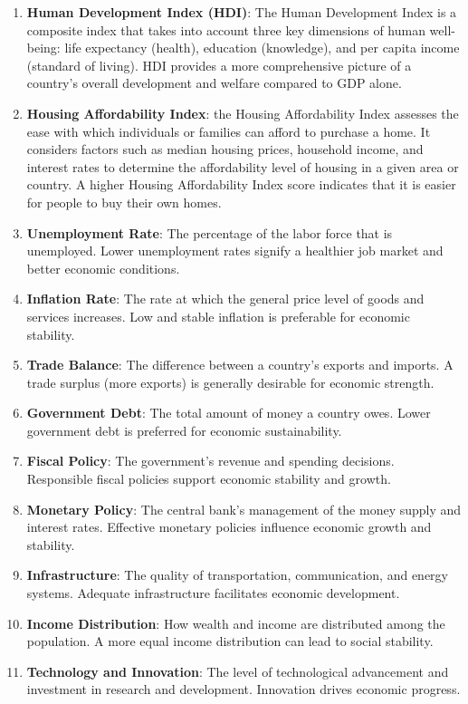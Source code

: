 \begin{enumerate}
  \item \textbf{Human Development Index (HDI)}: The Human Development
  Index is a composite index that takes into account three key
  dimensions of human well-being: life expectancy (health),
  education (knowledge), and per capita income (standard of living).
  HDI provides a more comprehensive picture of a country's overall
  development and welfare compared to GDP alone.
  
  \item \textbf{Housing Affordability Index}: the Housing Affordability
  Index assesses the ease with which individuals or families can afford
  to purchase a home. It considers factors such as median housing prices,
  household income, and interest rates to determine the affordability
  level of housing in a given area or country. A higher Housing
  Affordability Index score indicates that it is easier for people
  to buy their own homes.
  
  \item \textbf{Unemployment Rate}: The percentage of the labor force
  that is unemployed. Lower unemployment rates signify a healthier job
  market and better economic conditions.
  
  \item \textbf{Inflation Rate}: The rate at which the general price
  level of goods and services increases. Low and stable inflation is
  preferable for economic stability.
  
  \item \textbf{Trade Balance}: The difference between a country's
  exports and imports. A trade surplus (more exports) is generally
  desirable for economic strength.
  
  \item \textbf{Government Debt}: The total amount of money a country
  owes. Lower government debt is preferred for economic sustainability.
  
  \item \textbf{Fiscal Policy}: The government's revenue and spending
  decisions. Responsible fiscal policies support economic stability
  and growth.
  
  \item \textbf{Monetary Policy}: The central bank's management of the
  money supply and interest rates. Effective monetary policies
  influence economic growth and stability.
  
  \item \textbf{Infrastructure}: The quality of transportation,
  communication, and energy systems. Adequate infrastructure
  facilitates economic development.
  
  \item \textbf{Income Distribution}: How wealth and income are distributed
  among the population. A more equal income distribution can lead to
  social stability.
  
  \item \textbf{Technology and Innovation}: The level of technological
  advancement and investment in research and development. Innovation
  drives economic progress.
\end{enumerate}
